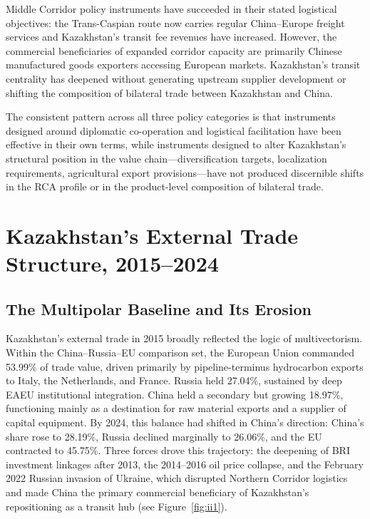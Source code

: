 \documentclass[12pt]{article}
\begin{document}
Middle Corridor policy instruments have succeeded in their stated logistical objectives: the Trans-Caspian route now carries regular China--Europe freight services and Kazakhstan's transit fee revenues have increased. However, the commercial beneficiaries of expanded corridor capacity are primarily Chinese manufactured goods exporters accessing European markets. Kazakhstan's transit centrality has deepened without generating upstream supplier development or shifting the composition of bilateral trade between Kazakhstan and China.

The consistent pattern across all three policy categories is that instruments designed around diplomatic co-operation and logistical facilitation have been effective in their own terms, while instruments designed to alter Kazakhstan's structural position in the value chain---diversification targets, localization requirements, agricultural export provisions---have not produced discernible shifts in the RCA profile or in the product-level composition of bilateral trade.

\section{Kazakhstan's External Trade Structure, 2015--2024}


\subsection{The Multipolar Baseline and Its Erosion}

Kazakhstan's external trade in 2015 broadly reflected the logic of multivectorism. Within the China--Russia--EU comparison set, the European Union commanded 53.99\% of trade value, driven primarily by pipeline-terminus hydrocarbon exports to Italy, the Netherlands, and France. Russia held 27.04\%, sustained by deep EAEU institutional integration. China held a secondary but growing 18.97\%, functioning mainly as a destination for raw material exports and a supplier of capital equipment. By 2024, this balance had shifted in China's direction: China's share rose to 28.19\%, Russia declined marginally to 26.06\%, and the EU contracted to 45.75\%. Three forces drove this trajectory: the deepening of BRI investment linkages after 2013, the 2014--2016 oil price collapse, and the February 2022 Russian invasion of Ukraine, which disrupted Northern Corridor logistics and made China the primary commercial beneficiary of Kazakhstan's repositioning as a transit hub (see Figure~\ref{fig:ii1}).
\end{document}
